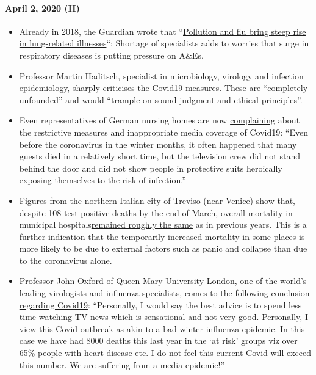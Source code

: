 \hypertarget{april-2-2020-ii}{%
\paragraph{April 2, 2020 (II)}\label{april-2-2020-ii}}

\begin{itemize}
\tightlist
\item
  Already in 2018, the Guardian wrote that
  ``\href{https://www.theguardian.com/society/2018/dec/09/steep-rise-lung-related-illness-hospitals-nhs}{Pollution
  and flu bring steep rise in lung-related illnesses}``: Shortage of
  specialists adds to worries that surge in respiratory diseases is
  putting pressure on A\&Es.
\item
  Professor Martin Haditsch, specialist in microbiology, virology and
  infection epidemiology,
  \href{https://www.youtube.com/watch?v=PtzHH8DhgZM}{sharply criticises
  the Covid19 measures}. These are ``completely unfounded'' and would
  ``trample on sound judgment and ethical principles''.
\item
  Even representatives of German nursing homes are now
  \href{https://pflege-prisma.de/2020/03/31/sterbezahlen-in-pflegeheimen/}{complaining}
  about the restrictive measures and inappropriate media coverage of
  Covid19: ``Even before the coronavirus in the winter months, it often
  happened that many guests died in a relatively short time, but the
  television crew did not stand behind the door and did not show people
  in protective suits heroically exposing themselves to the risk of
  infection.''\\
\item
  Figures from the northern Italian city of Treviso (near Venice) show
  that, despite 108 test-positive deaths by the end of March, overall
  mortality in municipal
  hospitals\href{https://swprs.files.wordpress.com/2020/04/reppublica-treviso.jpg}{remained
  roughly the same} as in previous years. This is a further indication
  that the temporarily increased mortality in some places is more likely
  to be due to external factors such as panic and collapse than due to
  the coronavirus alone.
\item
  Professor John Oxford of Queen Mary University London, one of the
  world's leading virologists and influenza specialists, comes to the
  following
  \href{https://novuscomms.com/2020/03/31/a-view-from-the-hvivo-open-orphan-orph-laboratory-professor-john-oxford/}{conclusion
  regarding Covid19}: ``Personally, I would say the best advice is to
  spend less time watching TV news which is sensational and not very
  good. Personally, I view this Covid outbreak as akin to a bad winter
  influenza epidemic. In this case we have had 8000 deaths this last
  year in the `at risk' groups viz over 65\% people with heart disease
  etc. I do not feel this current Covid will exceed this number. We are
  suffering from a media epidemic!''
\end{itemize}

